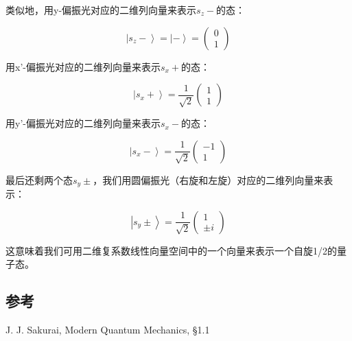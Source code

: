 类似地，用y-偏振光对应的二维列向量来表示$s_z -$的态：

\begin{equation}
\left| s_z - \right\rangle = \left| - \right\rangle = \left( \begin{array}{cc} 0 \\ 1 \end{array} \right)
\end{equation}

用x'-偏振光对应的二维列向量来表示$s_x +$的态：

\begin{equation}
\left| s_x + \right\rangle  = \frac{1}{\sqrt 2} \left( \begin{array}{cc} 1 \\ 1 \end{array} \right)
\end{equation}

用y'-偏振光对应的二维列向量来表示$s_x -$的态：

\begin{equation}
\left| s_x - \right\rangle  = \frac{1}{\sqrt 2} \left( \begin{array}{cc} -1 \\ 1 \end{array} \right)
\end{equation}

最后还剩两个态$s_y \pm$，我们用圆偏振光（右旋和左旋）对应的二维列向量来表示：

\begin{equation}
\left| s_y \pm \right\rangle = \frac{1}{\sqrt 2} \left( \begin{array}{cc} 1 \\ \pm i \end{array} \right)
\end{equation}

这意味着我们可用二维复系数线性向量空间中的一个向量来表示一个自旋1/2的量子态。

\subsection*{参考}

J. J. Sakurai, Modern Quantum Mechanics, \S 1.1